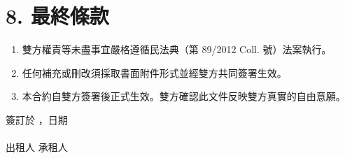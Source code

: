 \section*{8. 最終條款}
\begin{enumerate}[label=\arabic*.]
\item 雙方權責等未盡事宜嚴格遵循民法典（第 89/2012 Coll. 號）法案執行。
\item 任何補充或刪改須採取書面附件形式並經雙方共同簽署生效。
\item 本合約自雙方簽署後正式生效。雙方確認此文件反映雙方真實的自由意願。
\end{enumerate}
\vspace{2cm}
簽訂於 \ContractPlace，日期 \ContractDate \hfill \underline{\hspace{5cm}} \\ \vspace{1.5cm}
\underline{\hspace{5cm}} \hfill \underline{\hspace{5cm}} \\ \vspace{0.2cm}出租人 \hfill 承租人 \\
